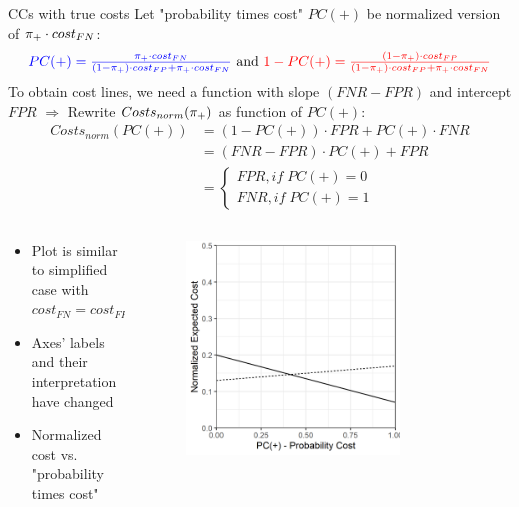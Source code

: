 \documentclass[11pt,compress,t,notes=noshow, xcolor=table]{beamer}
\begin{document}
\begin{vbframe}{CCs with true costs}
Let "probability times cost" $PC(+)$ be normalized version of $\pi_{+}\cdot cost_{FN}$:
\begin{align*}
   {\color{blue}PC(+)=\tfrac{\pi_{+}\cdot cost_{FN}}{(1-\pi_{+})\cdot cost_{FP} + \pi_{+}\cdot cost_{FN}}} \text{ and }
   {\color{red}1-PC(+)=\tfrac{(1-\pi_{+})\cdot cost_{FP}}{(1-\pi_{+})\cdot cost_{FP} + \pi_{+}\cdot cost_{FN}}}
\end{align*}
To obtain cost lines, we need a function with slope $(FNR - FPR)$ and intercept $FPR$ $\Rightarrow$ Rewrite $Costs_{norm}(\pi_{+})$ as function of $PC(+)$:
\begin{align*}
Costs_{norm}(PC(+)) &= (1-PC(+))\cdot FPR + PC(+)\cdot FNR \\
&= (FNR - FPR)\cdot PC(+) + FPR \\
&= \begin{cases}
  FPR, if\; PC(+) = 0 \\
  FNR, if\; PC(+) = 1
\end{cases}
\end{align*}
\begin{columns}[c]
\begin{column}{0.49\textwidth}
\begin{itemize}
  \item Plot is similar to simplified case with $cost_{FN} = cost_{FP}$ %
  \item Axes' labels and their interpretation have changed
  \item Normalized cost vs. "probability times cost"
\end{itemize}
\end{column}
\begin{column}{0.49\textwidth}
\begin{figure}
  \centering\includegraphics[width=0.75\textwidth]{figure/cost_curve.png}
\end{figure}
\end{column}
\end{columns}
\end{vbframe}
\end{document}
